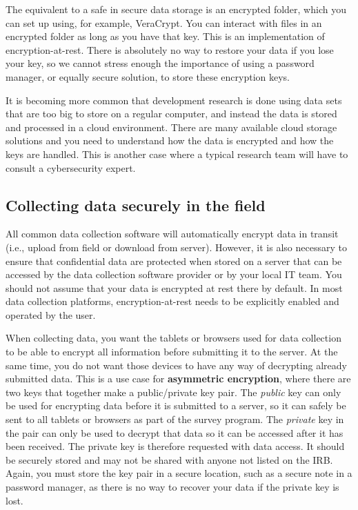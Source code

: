 The equivalent to a safe in secure data storage is an encrypted folder,
which you can set up using, for example, VeraCrypt.
You can interact with files in an encrypted folder
as long as you have that key.
This is an implementation of encryption-at-rest.
There is absolutely no way to restore your data if you lose your key,
so we cannot stress enough the importance of using a password manager,
or equally secure solution, to store these encryption keys.

It is becoming more common that development research
is done using data sets that are too big to store on a regular computer,
and instead the data is stored and processed in a cloud environment.
There are many available cloud storage solutions
and you need to understand how the data is encrypted
and how the keys are handled.
This is another case where a typical research team
will have to consult a cybersecurity expert.

\subsection{Collecting data securely in the field}

All common data collection software will automatically encrypt
data in transit (i.e., upload from field or download from server).
However, it is also necessary to ensure that confidential data
are protected when stored on a server that can be accessed
by the data collection software provider or by your local IT team.
You should not assume that your data is encrypted at rest there by default.
In most data collection platforms,
encryption-at-rest needs to be explicitly enabled and operated by the user.

When collecting data, you want the tablets or browsers used for data collection
to be able to encrypt all information before submitting it to the server.
At the same time, you do not want those devices to have any way of decrypting already submitted data.
This is a use case for \textbf{asymmetric encryption},
where there are two keys that together make a public/private key pair.
The \textit{public} key can only be used for encrypting data before it is submitted to a server,
so it can safely be sent to all tablets or browsers as part of the survey program.
The \textit{private} key in the pair can only be used to decrypt that data
so it can be accessed after it has been received.
The private key is therefore requested with data access.
It should be securely stored
and may not be shared with anyone not listed on the IRB.
Again, you must store the key pair in a secure location,
such as a secure note in a password manager,
as there is no way to recover your data if the private key is lost.

